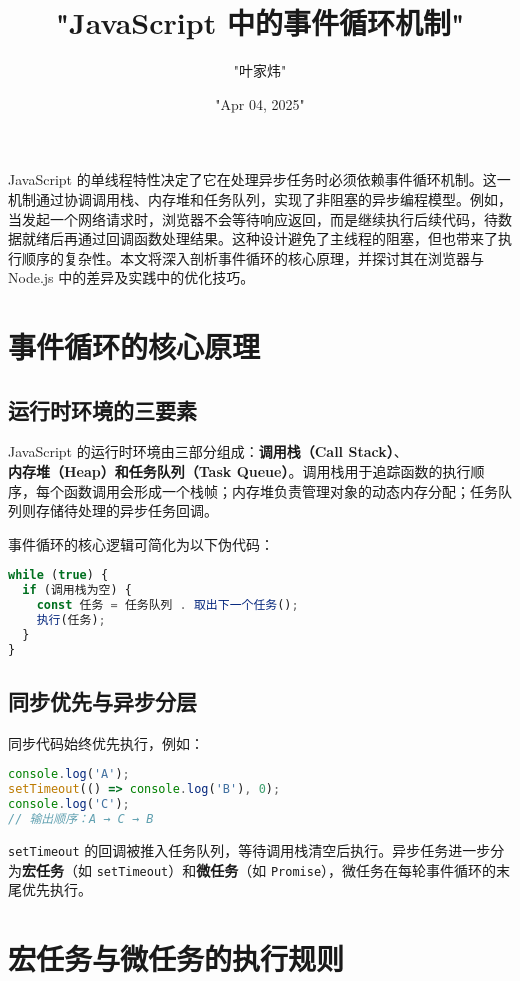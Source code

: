 \title{"JavaScript 中的事件循环机制"}
\author{"叶家炜"}
\date{"Apr 04, 2025"}
\maketitle
JavaScript 的单线程特性决定了它在处理异步任务时必须依赖事件循环机制。这一机制通过协调调用栈、内存堆和任务队列，实现了非阻塞的异步编程模型。例如，当发起一个网络请求时，浏览器不会等待响应返回，而是继续执行后续代码，待数据就绪后再通过回调函数处理结果。这种设计避免了主线程的阻塞，但也带来了执行顺序的复杂性。本文将深入剖析事件循环的核心原理，并探讨其在浏览器与 Node.js 中的差异及实践中的优化技巧。\par
\chapter{事件循环的核心原理}
\section{运行时环境的三要素}
JavaScript 的运行时环境由三部分组成：\textbf{调用栈（Call Stack）}、\textbf{内存堆（Heap）\textbf{和}任务队列（Task Queue）}。调用栈用于追踪函数的执行顺序，每个函数调用会形成一个栈帧；内存堆负责管理对象的动态内存分配；任务队列则存储待处理的异步任务回调。\par
事件循环的核心逻辑可简化为以下伪代码：\par
\begin{lstlisting}[language=javascript]
while (true) {
  if (调用栈为空) {
    const 任务 = 任务队列 . 取出下一个任务();
    执行(任务);
  }
}
\end{lstlisting}
\section{同步优先与异步分层}
同步代码始终优先执行，例如：\par
\begin{lstlisting}[language=javascript]
console.log('A');
setTimeout(() => console.log('B'), 0);
console.log('C');
// 输出顺序：A → C → B
\end{lstlisting}
\verb!setTimeout! 的回调被推入任务队列，等待调用栈清空后执行。异步任务进一步分为\textbf{宏任务}（如 \verb!setTimeout!）和\textbf{微任务}（如 \verb!Promise!），微任务在每轮事件循环的末尾优先执行。\par
\chapter{宏任务与微任务的执行规则}
